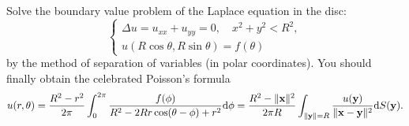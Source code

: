 \begin{pro}
  Solve the boundary value problem of the Laplace equation in the disc:
  \begin{displaymath}
    \begin{cases}
      \Delta u = u_{xx}+u_{yy} = 0, \quad x^2 + y^2 < R^2, \\
      u(R\cos\theta, R\sin\theta) = f(\theta)
    \end{cases}
  \end{displaymath}
  by the method of separation of variables (in polar coordinates).
  You should finally obtain the celebrated Poisson's formula
  \begin{displaymath}
    u(r, \theta) = \frac{R^2-r^2}{2\pi}\int_0^{2\pi}\frac{f(\phi)}{R^2-2Rr\cos(\theta-\phi)+r^2}\mathrm{d}\phi
    = \frac{R^2-\|\mathbf{x}\|^2}{2\pi R}\int_{\|\mathbf{y}\|=R}
    \frac{u(\mathbf{y})}{\|\mathbf{x}-\mathbf{y}\|^2}\mathrm{d} S(\mathbf{y}).
  \end{displaymath}
\end{pro}


